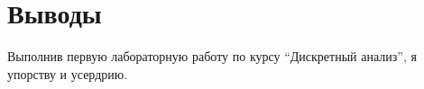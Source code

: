 \section{Выводы}

Выполнив первую лабораторную работу по курсу \enquote{Дискретный анализ}, я упорству и усердрию.

\pagebreak
